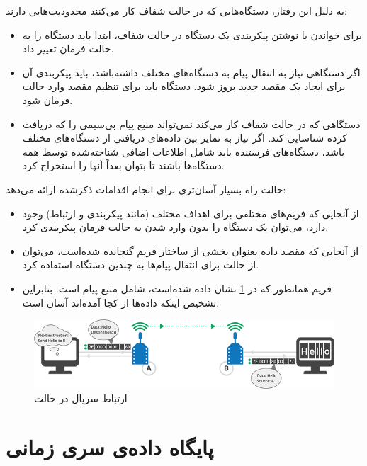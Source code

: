 به دلیل این رفتار، دستگاه‌هایی که در حالت شفاف کار می‌کنند محدودیت‌هایی دارند:
\begin{itemize}
\item برای خواندن یا نوشتن پیکربندی یک دستگاه در حالت شفاف، ابتدا باید دستگاه را به حالت فرمان تغییر داد.
\item اگر دستگاهی نیاز به انتقال پیام به دستگاه‌های مختلف داشته‌باشد، باید پیکربندی آن برای ایجاد یک مقصد جدید بروز شود. دستگاه باید برای تنظیم مقصد وارد حالت فرمان شود.
\item دستگاهی که در حالت شفاف کار می‌کند نمی‌تواند منبع پیام بی‌سیمی را که دریافت کرده شناسایی کند. اگر نیاز به تمایز بین داده‌های دریافتی از دستگاه‌های مختلف باشد، دستگاه‌های فرستنده باید شامل اطلاعات اضافی شناخته‌شده توسط همه دستگاه‌ها باشند تا بتوان بعداً آنها را استخراج کرد.
\end{itemize}

حالت  راه بسیار آسان‌تری برای انجام اقدامات ذکرشده ارائه می‌دهد:

\begin{itemize}
\item از آنجایی که فریم‌های مختلفی برای اهداف مختلف (مانند پیکربندی و ارتباط) وجود دارد، می‌توان یک دستگاه را بدون وارد شدن به حالت فرمان پیکربندی کرد.
\item از آنجایی که مقصد داده بعنوان بخشی از ساختار فریم  گنجانده شده‌است، می‌توان از حالت  برای انتقال پیام‌ها به چندین دستگاه استفاده کرد. 
\item فریم  همانطور که در \cref{fig:api_mode} \cite{Digi} نشان داده شده‌است، شامل منبع پیام است. بنابراین تشخیص اینکه داده‌ها از کجا آمده‌اند آسان است.
\end{itemize}

\begin{figure}[!h]
\centering\includegraphics[scale=.7]{api_mode.png}
\caption{ارتباط سریال در حالت  \cite{Digi}}\label{fig:api_mode}
\end{figure}


\section{پایگاه داده‌ی سری زمانی}

